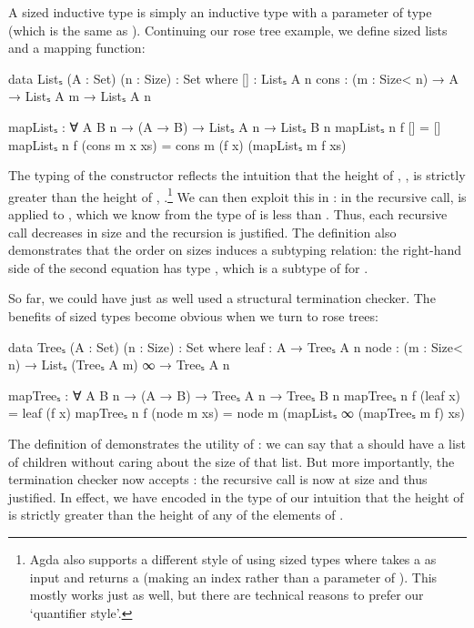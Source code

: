 A sized inductive type is simply an inductive type with a parameter of type
 (which is the same as ). Continuing our rose tree
example, we define sized lists and a mapping function:
\begin{code}
  data Listₛ (A : Set) (n : Size) : Set where
    []   : Listₛ A n
    cons : (m : Size< n) → A → Listₛ A m → Listₛ A n

  mapListₛ : ∀ {A B} n → (A → B) → Listₛ A n → Listₛ B n
  mapListₛ n f []            = []
  mapListₛ n f (cons m x xs) = cons m (f x) (mapListₛ m f xs)
\end{code}
The typing of the  constructor reflects the intuition that the
height of , , is strictly greater than the height of
, .\footnote{Agda also supports a different style of using
  sized types where  takes a  as input and returns
  a  (making  an index rather than a parameter of
  ). This mostly works just as well, but there are technical
  reasons to prefer our \enquote*{quantifier style}.} We can then exploit this
in : in the recursive call,  is applied to
, which we know from the type of  is less than .
Thus, each recursive call decreases in size and the recursion is justified. The
definition also demonstrates that the order on sizes induces a subtyping
relation: the right-hand side of the second equation has type ,
which is a subtype of  for .

So far, we could have just as well used a structural termination checker. The
benefits of sized types become obvious when we turn to rose trees:
\begin{code}
  data Treeₛ (A : Set) (n : Size) : Set where
    leaf : A → Treeₛ A n
    node : (m : Size< n) → Listₛ (Treeₛ A m) ∞ → Treeₛ A n

  mapTreeₛ : ∀ {A B} n → (A → B) → Treeₛ A n → Treeₛ B n
  mapTreeₛ n f (leaf x)    = leaf (f x)
  mapTreeₛ n f (node m xs) = node m (mapListₛ ∞ (mapTreeₛ m f) xs)
\end{code}
The definition of  demonstrates the utility of : we can
say that a  should have a list of children without caring about the
size of that list. But more importantly, the termination checker now accepts
: the recursive call is now at size  and thus
justified. In effect, we have encoded in the type of  our intuition
that the height of  is strictly greater than the height of any of
the elements of .

